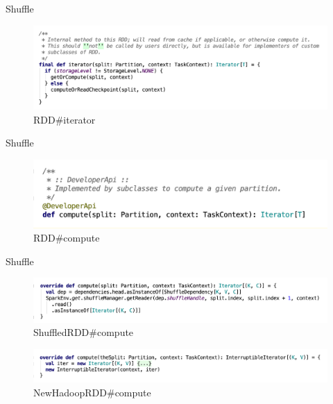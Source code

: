 \begin{frame}[plain,t]{Shuffle} %
	 \\  \vspace{2ex}
\begin{figure}
	\centering
	\includegraphics[width=1\linewidth]{images/rdd001}
	\caption{RDD\#iterator}
	\label{fig:rdd001}
\end{figure}

\end{frame}
\begin{frame}[plain,t]{Shuffle} %
	 \\  \vspace{2ex}
	\begin{figure}
		\centering
		\includegraphics[width=1\linewidth]{images/rdd002}
		\caption{RDD\#compute}
		\label{fig:rdd002}
	\end{figure}
	
\end{frame}
\begin{frame}[plain,t]{Shuffle} %
	 \\  \vspace{2ex}
	\begin{figure}
		\centering
		\includegraphics[width=1\linewidth]{images/rdd003}
		\caption{ShuffledRDD\#compute}
		\label{fig:rdd003}
	\end{figure}
		\begin{figure}
		\centering
		\includegraphics[width=1\linewidth]{images/rdd004}
		\caption{NewHadoopRDD\#compute}
		\label{fig:rdd004}
	\end{figure}
\end{frame}
